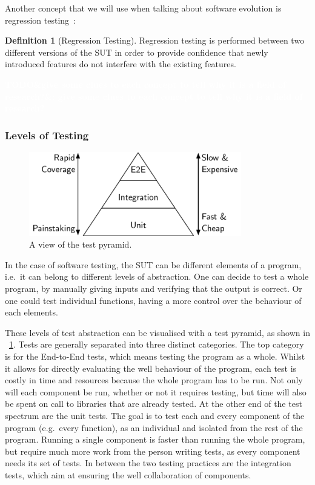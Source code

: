 \documentclass[11pt]{sdm_internship}
\newcommand{\todo}[1]{\colorbox{Red!75}{\textcolor{white}{\textbf{TODO\ifx&#1&\else: #1\fi}}}}
\theoremstyle{definition}
\newtheorem{definition}{Definition}[section]
\begin{document}
Another concept that we will use when talking about software evolution is regression testing~\cite{yoo2012regression}:
\begin{definition}[Regression Testing]
  Regression testing is performed between two different versions of the SUT in order to provide confidence that newly introduced features do not interfere with the existing features.
\end{definition}

\todo{give some clues to each concept to tell why it is a field of research?}

\subsubsection{Levels of Testing}%
\label{sssec:levels_testing}
\begin{figure}
  \centering
  \includegraphics[width=25em]{test_pyramid}
  \caption{A view of the test pyramid.}%
  \label{fig:test_pyramid}
\end{figure}

In the case of software testing, the SUT can be different elements of a program, i.e.\ it can belong to different levels of abstraction.
One can decide to test a whole program, by manually giving inputs and verifying that the output is correct.
Or one could test individual functions, having a more control over the behaviour of each elements.

These levels of test abstraction can be visualised with a test pyramid, as shown in \figurename~\ref{fig:test_pyramid}.
Tests are generally separated into three distinct categories.
The top category is for the End-to-End tests, which means testing the program as a whole.
Whilst it allows for directly evaluating the well behaviour of the program, each test is costly in time and resources because the whole program has to be run.
Not only will each component be run, whether or not it requires testing, but time will also be spent on call to libraries that are already tested.
At the other end of the test spectrum are the unit tests.
The goal is to test each and every component of the program (e.g.\ every function), as an individual and isolated from the rest of the program.
Running a single component is faster than running the whole program, but require much more work from the person writing tests, as every component needs its set of tests.
In between the two testing practices are the integration tests, which aim at ensuring the well collaboration of components.
\end{document}
